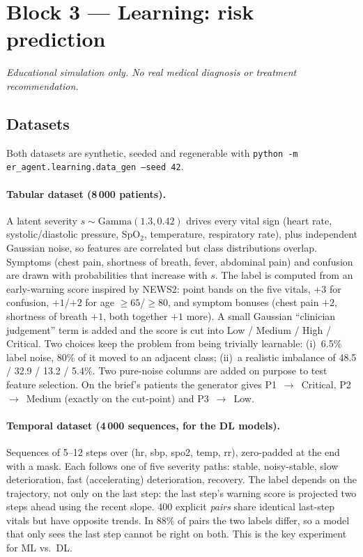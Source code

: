 \section{Block 3 --- Learning: risk prediction}

\noindent\textit{Educational simulation only. No real medical diagnosis or treatment recommendation.}

\subsection{Datasets}

Both datasets are synthetic, seeded and regenerable with
\texttt{python -m er\_agent.learning.data\_gen --seed 42}.

\paragraph{Tabular dataset (8\,000 patients).}
A latent severity $s\sim\mathrm{Gamma}(1.3, 0.42)$ drives every vital sign (heart rate, systolic/diastolic
pressure, SpO$_2$, temperature, respiratory rate), plus independent Gaussian noise, so features are correlated
but class distributions overlap. Symptoms (chest pain, shortness of breath, fever, abdominal pain) and
confusion are drawn with probabilities that increase with $s$. The label is computed from an early-warning
score inspired by NEWS2: point bands on the five vitals, $+3$ for confusion, $+1$/$+2$ for age $\geq65$/$\geq80$,
and symptom bonuses (chest pain $+2$, shortness of breath $+1$, both together $+1$ more). A small Gaussian
``clinician judgement'' term is added and the score is cut into Low / Medium / High / Critical.
Two choices keep the problem from being trivially learnable:
(i)~6.5\% label noise, 80\% of it moved to an adjacent class;
(ii)~a realistic imbalance of 48.5 / 32.9 / 13.2 / 5.4\%.
Two pure-noise columns are added on purpose to test feature selection.
On the brief's patients the generator gives P1~$\to$~Critical, P2~$\to$~Medium (exactly on the cut-point) and
P3~$\to$~Low.

\paragraph{Temporal dataset (4\,000 sequences, for the DL models).}
Sequences of 5--12 steps over (hr, sbp, spo2, temp, rr), zero-padded at the end with a mask. Each follows one
of five severity paths: stable, noisy-stable, slow deterioration, fast (accelerating) deterioration, recovery.
The label depends on the trajectory, not only on the last step: the last step's warning score is projected two
steps ahead using the recent slope. 400 explicit \emph{pairs} share identical last-step vitals but have
opposite trends. In 88\% of pairs the two labels differ, so a model that only sees the last step cannot be
right on both. This is the key experiment for ML vs.\ DL.

